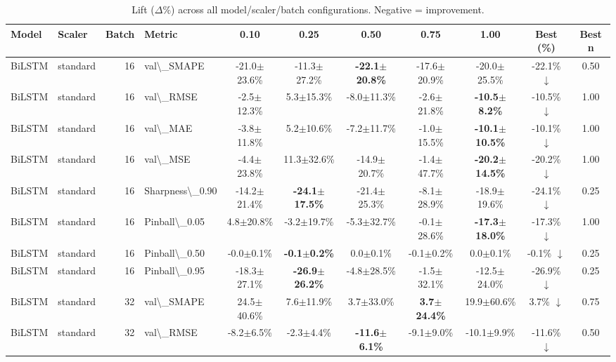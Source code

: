 \begin{table}[t]
\centering
\caption{Lift ($\Delta\%$) across all model/scaler/batch configurations. Negative = improvement.}
\label{tab:lift}
\begin{tabular}{l l r l c c c c c c c}
\toprule
Model & Scaler & Batch & Metric & 0.10 & 0.25 & 0.50 & 0.75 & 1.00 & Best (\%) & Best n \\
\midrule
BiLSTM & standard & 16 & val\textbackslash{}_SMAPE & -21.0$\pm$23.6\% & -11.3$\pm$27.2\% & \textbf{-22.1$\pm$20.8\%} & -17.6$\pm$20.9\% & -20.0$\pm$25.5\% & -22.1\% $\downarrow$ & 0.50 \\
BiLSTM & standard & 16 & val\textbackslash{}_RMSE & -2.5$\pm$12.3\% & 5.3$\pm$15.3\% & -8.0$\pm$11.3\% & -2.6$\pm$21.8\% & \textbf{-10.5$\pm$8.2\%} & -10.5\% $\downarrow$ & 1.00 \\
BiLSTM & standard & 16 & val\textbackslash{}_MAE & -3.8$\pm$11.8\% & 5.2$\pm$10.6\% & -7.2$\pm$11.7\% & -1.0$\pm$15.5\% & \textbf{-10.1$\pm$10.5\%} & -10.1\% $\downarrow$ & 1.00 \\
BiLSTM & standard & 16 & val\textbackslash{}_MSE & -4.4$\pm$23.8\% & 11.3$\pm$32.6\% & -14.9$\pm$20.7\% & -1.4$\pm$47.7\% & \textbf{-20.2$\pm$14.5\%} & -20.2\% $\downarrow$ & 1.00 \\
BiLSTM & standard & 16 & Sharpness\textbackslash{}_0.90 & -14.2$\pm$21.4\% & \textbf{-24.1$\pm$17.5\%} & -21.4$\pm$25.3\% & -8.1$\pm$28.9\% & -18.9$\pm$19.6\% & -24.1\% $\downarrow$ & 0.25 \\
BiLSTM & standard & 16 & Pinball\textbackslash{}_0.05 & 4.8$\pm$20.8\% & -3.2$\pm$19.7\% & -5.3$\pm$32.7\% & -0.1$\pm$28.6\% & \textbf{-17.3$\pm$18.0\%} & -17.3\% $\downarrow$ & 1.00 \\
BiLSTM & standard & 16 & Pinball\textbackslash{}_0.50 & -0.0$\pm$0.1\% & \textbf{-0.1$\pm$0.2\%} & 0.0$\pm$0.1\% & -0.1$\pm$0.2\% & 0.0$\pm$0.1\% & -0.1\% $\downarrow$ & 0.25 \\
BiLSTM & standard & 16 & Pinball\textbackslash{}_0.95 & -18.3$\pm$27.1\% & \textbf{-26.9$\pm$26.2\%} & -4.8$\pm$28.5\% & -1.5$\pm$32.1\% & -12.5$\pm$24.0\% & -26.9\% $\downarrow$ & 0.25 \\
BiLSTM & standard & 32 & val\textbackslash{}_SMAPE & 24.5$\pm$40.6\% & 7.6$\pm$11.9\% & 3.7$\pm$33.0\% & \textbf{3.7$\pm$24.4\%} & 19.9$\pm$60.6\% & 3.7\% $\downarrow$ & 0.75 \\
BiLSTM & standard & 32 & val\textbackslash{}_RMSE & -8.2$\pm$6.5\% & -2.3$\pm$4.4\% & \textbf{-11.6$\pm$6.1\%} & -9.1$\pm$9.0\% & -10.1$\pm$9.9\% & -11.6\% $\downarrow$ & 0.50 \\

\end{tabular}
\end{table}
